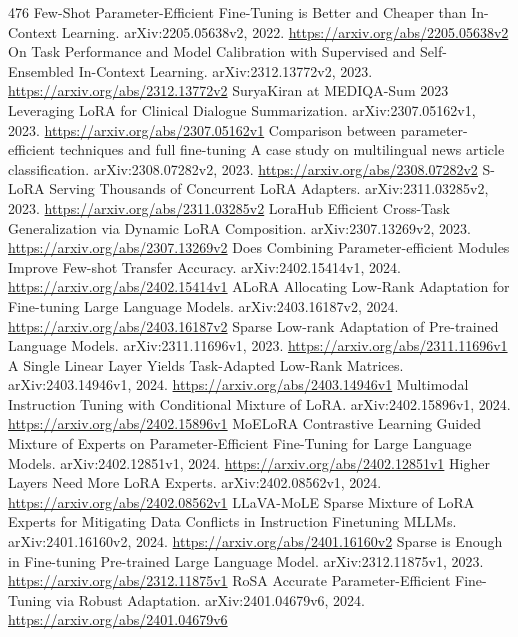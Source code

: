 \documentclass[11pt]{article}
\begin{document}
\begin{thebibliography}{476}
 Few-Shot Parameter-Efficient Fine-Tuning is Better and Cheaper than In-Context Learning. arXiv:2205.05638v2, 2022. \url{https://arxiv.org/abs/2205.05638v2}
 On Task Performance and Model Calibration with Supervised and Self-Ensembled In-Context Learning. arXiv:2312.13772v2, 2023. \url{https://arxiv.org/abs/2312.13772v2}
 SuryaKiran at MEDIQA-Sum 2023 Leveraging LoRA for Clinical Dialogue Summarization. arXiv:2307.05162v1, 2023. \url{https://arxiv.org/abs/2307.05162v1}
 Comparison between parameter-efficient techniques and full fine-tuning A case study on multilingual news article classification. arXiv:2308.07282v2, 2023. \url{https://arxiv.org/abs/2308.07282v2}
 S-LoRA Serving Thousands of Concurrent LoRA Adapters. arXiv:2311.03285v2, 2023. \url{https://arxiv.org/abs/2311.03285v2}
 LoraHub Efficient Cross-Task Generalization via Dynamic LoRA Composition. arXiv:2307.13269v2, 2023. \url{https://arxiv.org/abs/2307.13269v2}
 Does Combining Parameter-efficient Modules Improve Few-shot Transfer Accuracy. arXiv:2402.15414v1, 2024. \url{https://arxiv.org/abs/2402.15414v1}
 ALoRA Allocating Low-Rank Adaptation for Fine-tuning Large Language Models. arXiv:2403.16187v2, 2024. \url{https://arxiv.org/abs/2403.16187v2}
 Sparse Low-rank Adaptation of Pre-trained Language Models. arXiv:2311.11696v1, 2023. \url{https://arxiv.org/abs/2311.11696v1}
 A Single Linear Layer Yields Task-Adapted Low-Rank Matrices. arXiv:2403.14946v1, 2024. \url{https://arxiv.org/abs/2403.14946v1}
 Multimodal Instruction Tuning with Conditional Mixture of LoRA. arXiv:2402.15896v1, 2024. \url{https://arxiv.org/abs/2402.15896v1}
 MoELoRA Contrastive Learning Guided Mixture of Experts on Parameter-Efficient Fine-Tuning for Large Language Models. arXiv:2402.12851v1, 2024. \url{https://arxiv.org/abs/2402.12851v1}
 Higher Layers Need More LoRA Experts. arXiv:2402.08562v1, 2024. \url{https://arxiv.org/abs/2402.08562v1}
 LLaVA-MoLE Sparse Mixture of LoRA Experts for Mitigating Data Conflicts in Instruction Finetuning MLLMs. arXiv:2401.16160v2, 2024. \url{https://arxiv.org/abs/2401.16160v2}
 Sparse is Enough in Fine-tuning Pre-trained Large Language Model. arXiv:2312.11875v1, 2023. \url{https://arxiv.org/abs/2312.11875v1}
 RoSA Accurate Parameter-Efficient Fine-Tuning via Robust Adaptation. arXiv:2401.04679v6, 2024. \url{https://arxiv.org/abs/2401.04679v6}

\end{thebibliography}
\end{document}
